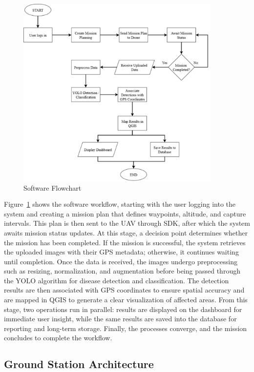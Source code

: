 \begin{figure}[H]
	\centering
	\caption{Software Flowchart}
	\label{fig:SoftFlow}
	\includegraphics[width=0.9\textwidth]{figures/Soft_Flow.pdf}
\end{figure}

Figure~\ref{fig:SoftFlow} shows the software workflow, starting with the user logging into the system and creating a mission plan that defines waypoints, altitude, and capture intervals. This plan is then sent to the UAV through SDK, after which the system awaits mission status updates. At this stage, a decision point determines whether the mission has been completed. If the mission is successful, the system retrieves the uploaded images with their GPS metadata; otherwise, it continues waiting until completion. Once the data is received, the images undergo preprocessing such as resizing, normalization, and augmentation before being passed through the YOLO algorithm for disease detection and classification. The detection results are then associated with GPS coordinates to ensure spatial accuracy and are mapped in QGIS to generate a clear visualization of affected areas. From this stage, two operations run in parallel: results are displayed on the dashboard for immediate user insight, while the same results are saved into the database for reporting and long-term storage. Finally, the processes converge, and the mission concludes to complete the workflow.

\subsection{Ground Station Architecture}

